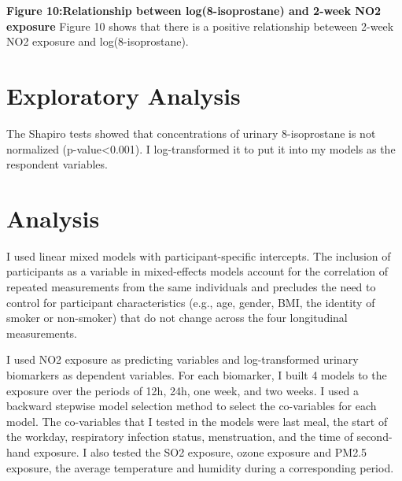 \documentclass[12pt,]{article}
\begin{document}
\center \textbf{Figure 10:Relationship between log(8-isoprostane) and
2-week NO2 exposure } \center Figure 10 shows that there is a positive
relationship beteween 2-week NO2 exposure and log(8-isoprostane).

\hypertarget{exploratory-analysis}{%
\section{Exploratory Analysis}\label{exploratory-analysis}}

The Shapiro tests showed that concentrations of urinary 8-isoprostane is
not normalized (p-value\textless0.001). I log-transformed it to put it
into my models as the respondent variables.

\hypertarget{analysis}{%
\section{Analysis}\label{analysis}}

I used linear mixed models with participant-specific intercepts. The
inclusion of participants as a variable in mixed-effects models account
for the correlation of repeated measurements from the same individuals
and precludes the need to control for participant characteristics (e.g.,
age, gender, BMI, the identity of smoker or non-smoker) that do not
change across the four longitudinal measurements.

I used NO2 exposure as predicting variables and log-transformed urinary
biomarkers as dependent variables. For each biomarker, I built 4 models
to the exposure over the periods of 12h, 24h, one week, and two weeks. I
used a backward stepwise model selection method to select the
co-variables for each model. The co-variables that I tested in the
models were last meal, the start of the workday, respiratory infection
status, menstruation, and the time of second-hand exposure. I also
tested the SO2 exposure, ozone exposure and PM2.5 exposure, the average
temperature and humidity during a corresponding period.
\end{document}
